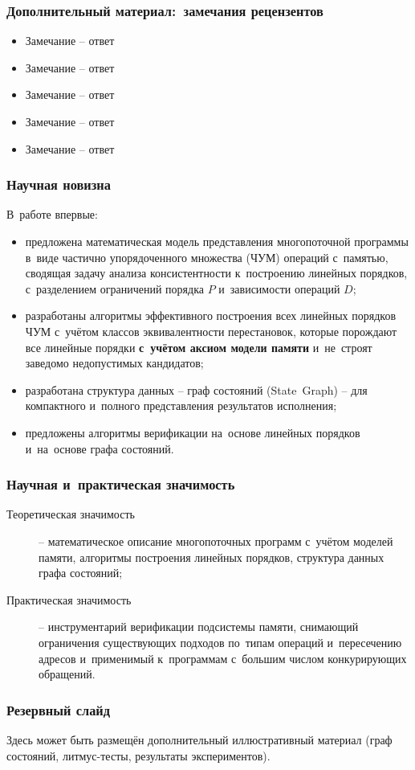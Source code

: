 
\begin{frame}
  \frametitle{Дополнительный материал:~замечания рецензентов}
  \begin{itemize}
    \item Замечание -- ответ
    \item Замечание -- ответ
    \item Замечание -- ответ
    \item Замечание -- ответ
    \item Замечание -- ответ
  \end{itemize}
\end{frame}

\begin{frame}
  \frametitle{Научная новизна}
  В~работе впервые:
  \begin{itemize}
    \item предложена математическая модель представления многопоточной
      программы в~виде частично упорядоченного множества (ЧУМ)
      операций с~памятью, сводящая задачу анализа
      консистентности к~построению линейных порядков, с~разделением
      ограничений порядка $P$ и~зависимости операций $D$;
    \item разработаны алгоритмы эффективного построения всех линейных
      порядков ЧУМ с~учётом классов эквивалентности перестановок, которые
      порождают все линейные порядки \textbf{с~учётом аксиом модели
      памяти} и~не~строят заведомо недопустимых кандидатов;
    \item разработана структура данных -- граф состояний (State~Graph)
      -- для компактного и~полного представления результатов исполнения;
    \item предложены алгоритмы верификации на~основе линейных порядков
      и~на~основе графа состояний.
  \end{itemize}
\end{frame}

\begin{frame}
  \frametitle{Научная и~практическая значимость}
  \begin{description}
    \item[Теоретическая значимость] -- математическое описание
      многопоточных программ с~учётом моделей памяти, алгоритмы
      построения линейных порядков, структура данных графа состояний;
    \item[Практическая значимость] -- инструментарий верификации
      подсистемы памяти, снимающий ограничения существующих подходов
      по~типам операций и~пересечению адресов и~применимый к~программам
      с~большим числом конкурирующих обращений.
  \end{description}
\end{frame}

\begin{frame}
  \frametitle{Резервный слайд}
  Здесь может быть размещён дополнительный иллюстративный материал
  (граф состояний, литмус-тесты, результаты экспериментов).
\end{frame}

